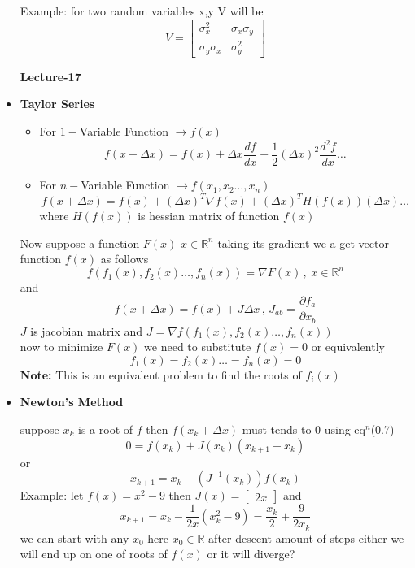 \documentclass[a4paper]{article}
\numberwithin{equation}{section}
\begin{document}
\begin{itemize}
Example: for two random variables x,y V will be 
\[V=\begin{bmatrix}
    \sigma_x^2&\sigma_x\sigma_y\\
    \sigma_y\sigma_x&\sigma_y^2
\end{bmatrix}\]

\begin{center}
    \textbf{\Huge{Lecture-17}}
\end{center}
\vspace{5pt}
\item \textbf{Taylor Series}
\begin{itemize}
    \item For $1-$Variable Function $\rightarrow f(x)$
    \[f(x+\Delta x)=f(x)+\Delta x \frac{df}{dx}+\frac{1}{2}(\Delta x)^2\frac{d^2f}{dx}\dots\]
    \item For $n-$Variable Function $\rightarrow f(x_1,x_2\dots,x_n)$
    \[f(x+\Delta x)=f(x)+(\Delta x)^T \nabla f(x)+(\Delta x)^T H(f(x))(\Delta x)\dots\]
    where $H(f(x))$ is hessian matrix of function $f(x)$
\end{itemize}

Now suppose a function  $F(x)$ $x\in \mathbb{R}^n$ taking its gradient we a get vector function $f(x)$ as follows
\[f(f_1(x),f_2(x)\dots,f_n(x))=\nabla F(x) \hspace{2pt},\hspace{3pt} x \in \mathbb{R}^n\]
and
\begin{equation}
    f(x+\Delta x)=f(x)+J\Delta x \hspace{2pt},\hspace{2pt} J_{ab}=\frac{\partial f_a}{\partial x_b}
\end{equation}
$J$ is jacobian matrix and $J=\nabla f(f_1(x),f_2(x)\dots,f_n(x))$\\
now to minimize $F(x)$ we need to substitute $f(x)=0$ or equivalently
\[f_1(x)=f_2(x)\dots=f_n(x)=0\]
\textbf{Note:} This is an equivalent problem to find the roots of $f_i(x)$\\

\item \textbf{Newton's Method}

suppose $x_k$ is a root of $f$ then $f(x_k+\Delta x) $ must tends to 0 using eq$^n$(0.7)
\[0=f(x_k)+J(x_k)(x_{k+1}-x_k)\]
or 
\[\boxed{x_{k+1}=x_k-(J^{-1}(x_k))f(x_k)}\]
Example: let $f(x)=x^2-9$ then $J(x)=\begin{bmatrix}2x\end{bmatrix}$ and 
\[x_{k+1}=x_k-\frac{1}{2x}(x_k^2-9)=\frac{x_k}{2}+\frac{9}{2x_k}\]
we can start with any $x_0$ here $x_0\in \mathbb{R}$ after descent amount of steps either we will end up on one of roots of $f(x)$ or it will diverge?


\end{itemize}
\end{document}

